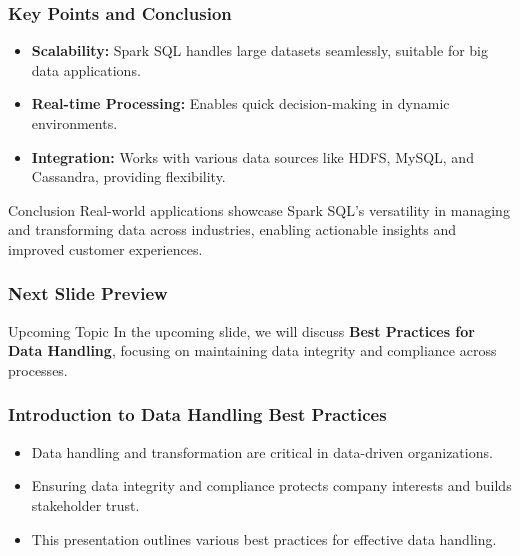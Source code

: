 \documentclass[aspectratio=169]{beamer}
\begin{document}
\begin{frame}
  \frametitle{Key Points and Conclusion}
  \begin{itemize}
    \item \textbf{Scalability:} Spark SQL handles large datasets seamlessly, suitable for big data applications.
    \item \textbf{Real-time Processing:} Enables quick decision-making in dynamic environments.
    \item \textbf{Integration:} Works with various data sources like HDFS, MySQL, and Cassandra, providing flexibility.
  \end{itemize}
  \begin{block}{Conclusion}
    Real-world applications showcase Spark SQL’s versatility in managing and transforming data across industries, enabling actionable insights and improved customer experiences.
  \end{block}
\end{frame}

\begin{frame}
  \frametitle{Next Slide Preview}
  \begin{block}{Upcoming Topic}
    In the upcoming slide, we will discuss \textbf{Best Practices for Data Handling}, focusing on maintaining data integrity and compliance across processes.
  \end{block}
\end{frame}

\begin{frame}
    \titlepage
\end{frame}

\begin{frame}
    \frametitle{Introduction to Data Handling Best Practices}
    \begin{itemize}
        \item Data handling and transformation are critical in data-driven organizations.
        \item Ensuring data integrity and compliance protects company interests and builds stakeholder trust.
        \item This presentation outlines various best practices for effective data handling.
    \end{itemize}
\end{frame}
\end{document}
